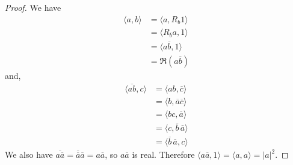 \begin{proof}
    We have 
    \begin{align*}\langle a,b\rangle &= \langle a,R_b1\rangle\\& = \langle R_{\overline{b}}a,1\rangle \\&= \langle a\overline{b},1\rangle\\& = \Re(a\overline{b})
    \end{align*}
    and,
    \begin{align*}
        \langle \overline{ab},c\rangle &= \langle ab,\overline{c}\rangle\\
        &= \langle b,\overline{a}\overline{c}\rangle\\
        &=\langle bc,\overline{a}\rangle\\
        &=\langle c,\overline{b}\,\overline{a}\rangle\\
        &=\langle \overline{b}\,\overline{a},c\rangle
    \end{align*}
    We also have $\overline{a\overline{a}} = \overline{\overline{a}}\overline{a}=a\overline{a}$, so $a\overline{a}$ is real. Therefore $\langle a\overline{a},1\rangle = \langle a,a\rangle = |a|^2$.
\end{proof}
